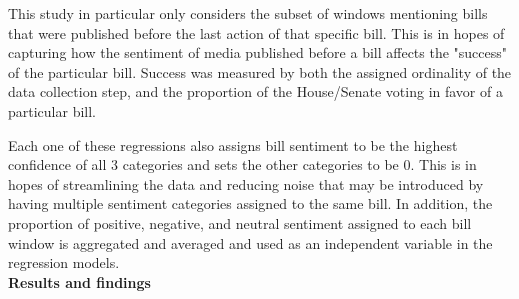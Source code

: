 \documentclass[letterpaper,11pt]{article}
\begin{document}
    This study in particular only considers the subset of windows mentioning bills that were published before the last action of that specific bill. This is in hopes of capturing how the sentiment of media published before a bill affects the "success" of the particular bill. Success was measured by both the assigned ordinality of the data collection step, and the proportion of the House/Senate voting in favor of a particular bill. 

    Each one of these regressions also assigns bill sentiment to be the highest confidence of all 3 categories and sets the other categories to be 0. This is in hopes of streamlining the data and reducing noise that may be introduced by having multiple sentiment categories assigned to the same bill. In addition, the proportion of positive, negative, and neutral sentiment assigned to each bill window is aggregated and averaged and used as an independent variable in the regression models. \\
    \textbf{Results and findings}
\end{document}
